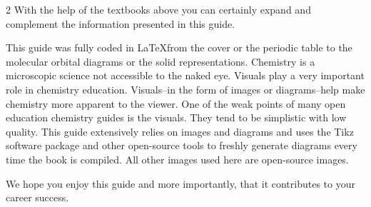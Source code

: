 \documentclass[main.tex]{subfiles}
\begin{document}
\begin{fullwidth}
\begin{multicols*}{2}
With the help of the textbooks above you can certainly expand and complement the information presented in this guide.

This guide was fully coded in \LaTeX from the cover or the periodic table to the molecular orbital diagrams or the solid representations. Chemistry is a microscopic science not accessible to the naked eye. Visuals play a very important role in chemistry education. Visuals--in the form of images or diagrams--help make chemistry more apparent to the viewer. One of the weak points of many open education chemistry guides is the visuals. They tend to be simplistic with low quality. This guide extensively relies on images and diagrams and uses the Tikz software package and other open-source tools to freshly generate diagrams every time the book is compiled. All other images used here are open-source images.

We hope you enjoy this guide and more importantly, that it contributes to your career success.  
\end{multicols*}
\clearpage\thispagestyle{empty}\mbox{}\clearpage

\end{fullwidth}
\restoregeometry
{}
\end{document}
